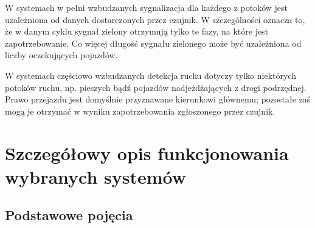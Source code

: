 \documentclass{pracamgr}
\begin{document}
W systemach w pełni wzbudzanych sygnalizacja dla każdego z potoków
jest uzależniona od danych dostarczonych przez czujnik. W
szczególności oznacza to, że w danym cyklu sygnał zielony otrzymują
tylko te fazy, na które jest zapotrzebowanie. Co więcej długość
sygnału zielonego może być uzależniona od liczby oczekujących pojazdów.

W systemach częściowo wzbudzanych detekcja ruchu dotyczy tylko
niektórych potoków ruchu, np. pieszych bądź pojazdów nadjeżdżających z
drogi podrzędnej. Prawo przejazdu jest domyślnie przyznawane
kierunkowi głównemu; pozostałe zaś mogą je otrzymać w wyniku
zapotrzebowania zgłoszonego przez czujnik.

\section{Szczegółowy opis funkcjonowania wybranych systemów}
\label{s:szczegoly}

\subsection{Podstawowe pojęcia}
 \label{ss:pojecia}
\end{document}
